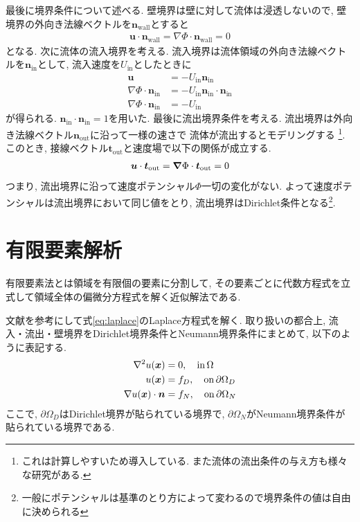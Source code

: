 \documentclass{ltjsarticle}
\begin{document}
最後に境界条件について述べる.
壁境界は壁に対して流体は浸透しないので, 
壁境界の外向き法線ベクトルを$\bm{n}_\mathrm{wall}$とすると
\begin{align}
    \bm{u}\cdot\bm{n}_\mathrm{wall} = \nabla\Phi\cdot\bm{n}_\mathrm{wall} =0
\end{align}
となる.
次に流体の流入境界を考える.
流入境界は流体領域の外向き法線ベクトルを$\bm{n}_\mathrm{in}$として, 流入速度を$U_\mathrm{in}$としたときに
\begin{align}
    \bm{u} &= -U_\mathrm{in}\bm{n}_\mathrm{in} \\  
    \nabla\Phi \cdot \bm{n}_\mathrm{in} &= -U_\mathrm{in}\bm{n}_\mathrm{in} \cdot \bm{n}_\mathrm{in} \\
    \nabla\Phi \cdot \bm{n}_\mathrm{in} &= -U_\mathrm{in}
\end{align}
が得られる. $\bm{n}_\mathrm{in} \cdot \bm{n}_\mathrm{in} =1$を用いた.
最後に流出境界条件を考える. 
流出境界は外向き法線ベクトル$\bm{n}_\mathrm{out}$に沿って一様の速さで
流体が流出するとモデリングする
\footnote{これは計算しやすいため導入している. また流体の流出条件の与え方も様々な研究がある.}.
このとき, 接線ベクトル$\bm{t}_\mathrm{out}$と速度場で以下の関係が成立する.
\begin{align}
    \bm{u}\cdot\bm{t}_\mathrm{out} =  \grad\Phi\cdot\bm{t}_\mathrm{out} =0
\end{align}
つまり, 流出境界に沿って速度ポテンシャル$\Phi$一切の変化がない.
よって速度ポテンシャルは流出境界において同じ値をとり, 
流出境界はDirichlet条件となる\footnote{一般にポテンシャルは基準のとり方によって変わるので境界条件の値は自由に決められる}.

\section{有限要素解析}
有限要素法とは領域を有限個の要素に分割して, 
その要素ごとに代数方程式を立式して領域全体の偏微分方程式を解く近似解法である.

文献\cite{Larson2013}を参考にして式\eqref{eq:laplace}のLaplace方程式を解く.
取り扱いの都合上, 流入・流出・壁境界をDirichlet境界条件とNeumann境界条件にまとめて,
以下のように表記する.
\begin{align}
    \laplacian u(\bm{x}) &= 0,\quad \mathrm{in}\,\Omega \label{eq:gov} \\
    u(\bm{x}) &= f_D,\quad \mathrm{on}\,\partial \Omega_D \label{eq:dirichlet_bc} \\
    \nabla u(\bm{x})\cdot\bm{n} &= f_N,\quad \mathrm{on}\,\partial \Omega_N \label{eq:neumann_bc} 
\end{align}
ここで, $\partial\Omega_D$はDirichlet境界が貼られている境界で, 
$\partial\Omega_N$がNeumann境界条件が貼られている境界である.
\end{document}
